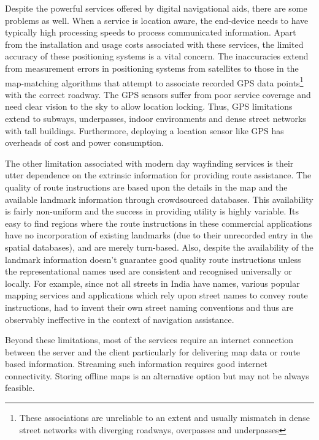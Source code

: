 \documentclass{iitkthesis}
\begin{document}
Despite the powerful services offered by digital navigational aids, there 
are some problems as well. When a service is location aware, 
the end-device needs to have typically high processing speeds to process 
communicated information. Apart from 
the installation and usage costs associated with these services, the 
limited accuracy of these positioning systems is a vital concern. The 
inaccuracies extend from measurement errors in positioning systems from 
satellites to those in the map-matching algorithms \cite{white2000} that 
attempt to associate recorded GPS data points\footnote{These associations 
are unreliable to an extent and usually mismatch in dense street networks 
with diverging roadways, overpasses and underpasses} with the correct 
roadway. The GPS sensors suffer from poor service coverage and need clear 
vision to the sky to allow location locking. Thus, GPS limitations extend 
to subways, underpasses, indoor environments and dense street networks 
with tall buildings. Furthermore, deploying a location sensor like GPS 
has overheads of cost and power consumption.

The other limitation associated with modern day wayfinding services is 
their utter dependence on the extrinsic information for providing route 
assistance. The quality of route instructions are based upon the details 
in the map and the available landmark information through crowdsourced 
databases. This availability is fairly non-uniform and the success in 
providing utility is highly variable. Its easy to find regions where the 
route instructions in these commercial applications have no incorporation 
of existing landmarks (due to their unrecorded entry in the spatial 
databases), and are merely turn-based. Also, despite the availability of 
the landmark information doesn't guarantee good quality route 
instructions unless the representational names used are consistent and 
recognised universally or locally. For example, since not all streets in 
India have names, various popular mapping services and applications which 
rely upon street names to convey route instructions, had to invent their 
own street naming conventions and thus are observably ineffective in the 
context of navigation assistance.

Beyond these limitations, most of the services require an internet 
connection between the server and the client particularly for 
delivering map data or route based information. Streaming such  
information requires good internet connectivity. Storing offline maps is 
an alternative option but may not be always feasible.   
\end{document}
